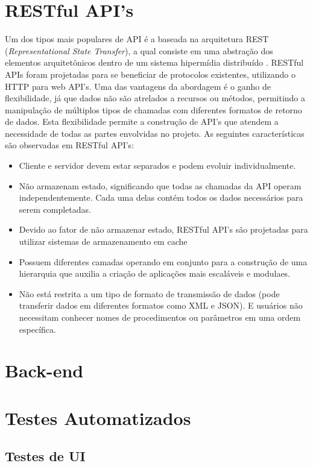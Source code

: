 \section{RESTful API's}
Um dos tipos mais populares de API é a baseada na arquitetura REST (\textit{Representational State Transfer}), a qual consiste em uma abstração dos elementos arquitetônicos dentro de um sistema hipermídia distribuído . 
RESTful APIs foram projetadas para se beneficiar de protocolos existentes, utilizando o HTTP para web API's. Uma das vantagens da abordagem é o ganho de flexibilidade, já que dados não são atrelados a recursos ou métodos, permitindo a manipulação de múltiplos tipos de chamadas com diferentes formatos de retorno de dados. Esta flexibilidade permite a construção de API's que atendem a necessidade de todas as partes envolvidas no projeto. As seguintes características são observadas em RESTful API's:

\begin{itemize}
    \item Cliente e servidor devem estar separados e podem evoluir individualmente.
    \item Não armazenam estado, significando que todas as chamadas da API operam independentemente. Cada uma delas contém todos os dados necessários para serem completadas.
    \item Devido ao fator de não armazenar estado, RESTful API's são projetadas para utilizar sistemas de armazenamento em cache
    \item Possuem diferentes camadas operando em conjunto para a construção de uma hierarquia que auxilia a criação de aplicações mais escaláveis e modulaes.
    \item Não está restrita a um tipo de formato de transmissão de dados (pode transferir dados em diferentes formatos como XML e JSON). E usuários não necessitam conhecer nomes de procedimentos ou parâmetros em uma ordem específica.
\end{itemize}

\section{Back-end}

\section{Testes Automatizados}
\subsection{Testes de UI}
